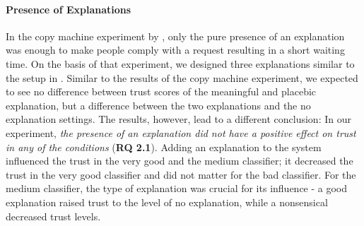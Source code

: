 \paragraph{Presence of Explanations} 
In the copy machine experiment by \cite{langer1978mindlessness}, only the pure presence of an explanation was enough to make people comply with a request resulting in a short waiting time. On the basis of that experiment, we designed three explanations similar to the setup in \cite{langer1978mindlessness}. Similar to the results of the copy machine experiment, we expected to see no difference between trust scores of the meaningful and placebic explanation, but a difference between the two explanations and the no explanation settings. The results, however, lead to a different conclusion: In our experiment, \textit{the presence of an explanation did not have a positive effect on trust in any of the conditions} (\textbf{RQ 2.1}). Adding an explanation to the system influenced the trust in the very good and the medium classifier; it decreased the trust in the very good classifier and did not matter for the bad classifier. For the medium classifier, the type of explanation was crucial for its influence - a good explanation raised trust to the level of no explanation, while a nonsensical decreased trust levels.\newline
